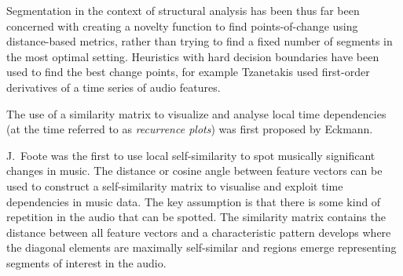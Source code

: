 \documentclass[twocolumn]{article}
\begin{document}
	Segmentation in the context of structural analysis has been thus far been concerned with creating a novelty function to find points-of-change using distance-based metrics, rather than trying to find a fixed number of segments in the most optimal setting. Heuristics with hard decision boundaries have been used to find the best change points, for example Tzanetakis \cite{tzanetakis1999framework} used first-order derivatives of a time series of audio features. 
	
	The use of a similarity matrix to visualize and analyse local time dependencies (at the time referred to as \textit{recurrence plots}) was first proposed by Eckmann\citep{eckmann1987recurrence}.
	
	J.\ Foote \citep{cooper2002automatic, foote1999visualizing,foote1997similarity,foote2000automatic,foote2003media,foote2001visualizing} was the first to use local self-similarity to spot musically significant changes in music. The distance or cosine angle between feature vectors can be used to construct a self-similarity matrix to visualise and exploit time dependencies in music data. The key assumption is that there is some kind of repetition in the audio that can be spotted. The similarity matrix contains the distance between all feature vectors and a characteristic pattern develops where the diagonal elements are maximally self-similar and regions emerge representing segments of interest in the audio.  
	
\end{document}
